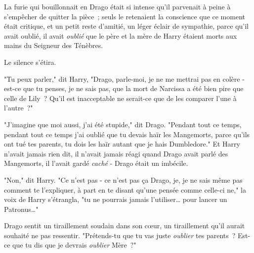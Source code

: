 \later

La furie qui bouillonnait en Drago était si intense qu'il parvenait à peine à s'empêcher de quitter la pièce~; seuls le retenaient la conscience que ce moment était critique, et un petit reste d'amitié, un léger éclair de sympathie, parce qu'il avait oublié, il avait \emph{oublié} que le père et la mère de Harry étaient morts aux mains du Seigneur des Ténèbres.

Le silence s'étira.

"Tu peux parler," dit Harry, "Drago, parle-moi, je ne me mettrai pas en colère - est-ce que tu penses, je ne sais pas, que la mort de Narcissa a été bien pire que celle de Lily~? Qu'il est inacceptable ne serait-ce que de les comparer l'une à l'autre~?"

"J'imagine que moi aussi, j'ai été stupide," dit Drago. "Pendant tout ce temps, pendant tout ce temps j'ai oublié que tu devais haïr les Mangemorts, parce qu'ils ont tué tes parents, tu dois les haïr autant que je hais Dumbledore." Et Harry n'avait jamais rien dit, il n'avait jamais réagi quand Drago avait parlé des Mangemorts, il l'avait gardé \emph{caché} - Drago était un imbécile.

"Non," dit Harry. "Ce n'est pas - ce n'est pas ça Drago, je, je ne sais même pas comment te l'expliquer, à part en te disant qu'une pensée comme celle-ci ne," la voix de Harry s'étrangla, "tu ne pourrais jamais l'utiliser… pour lancer un Patronus…"

Drago sentit un tiraillement soudain dans son cœur, un tiraillement qu'il aurait souhaité ne pas ressentir. "Prétends-tu que tu vas juste \emph{oublier} tes parents~? Est-ce que tu dis que je devrais \emph{oublier} Mère~?"

